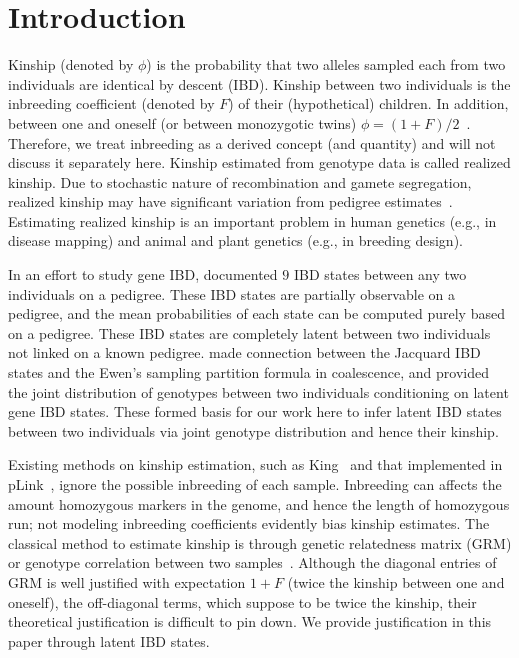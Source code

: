\documentclass[11pt,Times]{article}
\def\cite{\citep}
\begin{document}
\newpage
\section{Introduction}
Kinship (denoted by $\phi$) is the probability that two alleles sampled each from two individuals are identical by descent (IBD).  Kinship between two individuals is the inbreeding coefficient (denoted by $F$) of their (hypothetical) children. In addition, between one and oneself (or between monozygotic twins) $\phi = (1+F)/2$~\cite{wright.22}.  Therefore, we treat inbreeding as a derived concept (and quantity) and will not discuss it separately here. Kinship estimated from genotype data is called realized kinship. Due to stochastic nature of recombination and gamete segregation, realized kinship may have significant variation from pedigree estimates~\cite{visscher.etal.06}.  Estimating realized kinship is an important problem in human genetics (e.g., in disease mapping) and animal and plant genetics (e.g., in breeding design). 
%

In an effort to study gene IBD, \citet{jacquard.72} documented $9$ IBD states between any two individuals on a pedigree. These IBD states are partially observable on a pedigree, and the mean probabilities of each state can be computed purely based on a pedigree.  These IBD states are completely latent between two individuals not linked on a known pedigree.  \citet{thompson.13} made connection between the Jacquard IBD states and the Ewen's sampling partition formula in coalescence, and provided the joint distribution of genotypes between two individuals conditioning on latent gene IBD states. These formed basis for our work here to infer latent IBD states between two individuals via joint genotype distribution and hence their kinship.   


Existing methods on kinship estimation, such as King~\cite{king} and that implemented in pLink~\cite{plink}, ignore the possible inbreeding of each sample. Inbreeding can affects the amount homozygous markers in the genome, and hence the length of homozygous run; not modeling inbreeding coefficients evidently bias kinship estimates. 
The classical method to estimate kinship is through genetic relatedness matrix (GRM) or genotype correlation between two samples~\cite{eigenstrat, gcta, wang.etal.17}. Although the diagonal entries of GRM is well justified with expectation $1+F$ (twice the kinship between one and oneself), the off-diagonal terms, which suppose to be twice the kinship, their theoretical justification is difficult to pin down. We provide justification in this paper through latent IBD states. 
\end{document}
